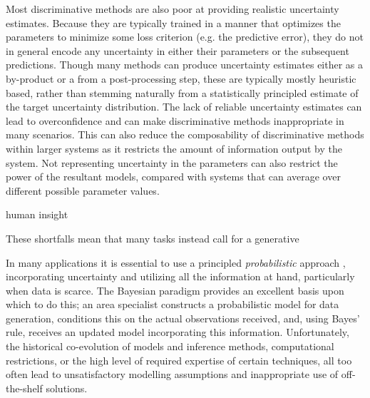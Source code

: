 Most discriminative methods are also poor at providing realistic uncertainty estimates.
Because they are typically trained in a manner that optimizes the parameters to minimize
some loss criterion (e.g. the predictive error), they do not in general encode any uncertainty
in either their parameters or the subsequent predictions.  Though many methods can
produce uncertainty estimates either as a by-product or a from a post-processing step,
these are typically mostly heuristic based, rather than stemming naturally from a statistically
principled estimate of the target uncertainty distribution.   The lack of reliable uncertainty
estimates can lead to overconfidence and can make discriminative methods inappropriate in
many scenarios.  This can also reduce the composability of discriminative methods within
larger systems as it restricts the amount of information output by the system.
Not representing uncertainty in the parameters can also restrict the power of the resultant
models, compared with systems that can average over different possible parameter values.


human insight

These shortfalls mean that many tasks instead call for a generative 

In many applications it is essential to use a principled \emph{probabilistic} 
approach \cite{ghahramani2015probabilistic}, incorporating uncertainty and utilizing all the information at hand, 
particularly when data is scarce.  The Bayesian paradigm provides an excellent basis upon which to do this; an area 
specialist constructs a probabilistic model for data generation, conditions this on the actual observations received, 
and, using Bayes' rule, receives an updated model incorporating this information.  Unfortunately, the historical 
co-evolution of models and inference methods, computational restrictions, or the high level of required expertise 
of certain techniques, all too often lead to unsatisfactory modelling assumptions and inappropriate use of off-the-shelf solutions.


